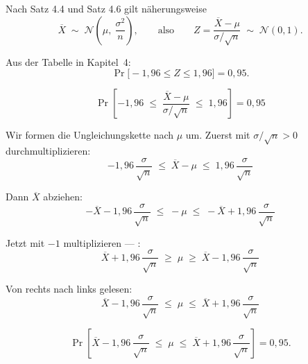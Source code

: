 \begin{merksatz}
Nach Satz 4.4 und Satz 4.6 gilt näherungsweise
\[ \overline X \;\sim\; \mathcal{N}\!\left(\mu,\ \frac{\sigma^2}{n}\right), \qquad \text{also} \qquad Z = \frac{\overline X - \mu}{\sigma/\sqrt n} \;\sim\; \mathcal{N}(0,1) . \]

Aus der Tabelle in Kapitel~4:
\[ \Pr\bigl[-1{,}96 \le Z \le 1{,}96\bigr] = 0{,}95 . \]

\[ \Pr\!\left[-1{,}96 \;\le\; \frac{\overline X - \mu}{\sigma/\sqrt n} \;\le\; 1{,}96\right] = 0{,}95 \]

Wir formen die Ungleichungskette nach $\mu$ um. Zuerst mit $\sigma/\sqrt n > 0$ durchmultiplizieren:
\[ -1{,}96\,\frac{\sigma}{\sqrt n} \;\le\; \overline X - \mu \;\le\; 1{,}96\,\frac{\sigma}{\sqrt n} \]

Dann $\overline X$ abziehen:
\[ -\overline X - 1{,}96\,\frac{\sigma}{\sqrt n} \;\le\; -\mu \;\le\; -\overline X + 1{,}96\,\frac{\sigma}{\sqrt n} \]

Jetzt mit $-1$ multiplizieren --- :
\[ \overline X + 1{,}96\,\frac{\sigma}{\sqrt n} \;\ge\; \mu \;\ge\; \overline X - 1{,}96\,\frac{\sigma}{\sqrt n} \]

Von rechts nach links gelesen:
\[ \overline X - 1{,}96\,\frac{\sigma}{\sqrt n} \;\le\; \mu \;\le\; \overline X + 1{,}96\,\frac{\sigma}{\sqrt n} \]

\[ \Pr\!\left[\overline X - 1{,}96\,\frac{\sigma}{\sqrt n} \;\le\; \mu \;\le\; \overline X + 1{,}96\,\frac{\sigma}{\sqrt n}\right] = 0{,}95 . \]
\end{merksatz}

